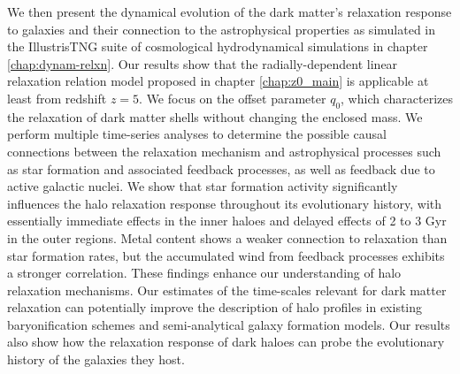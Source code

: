 \documentclass[a4paper, 12pt, oneside]{Thesis}  %
\begin{document}
{We then present the dynamical evolution of the dark matter's relaxation response to galaxies and their connection to the astrophysical properties as simulated in the IllustrisTNG suite of cosmological hydrodynamical simulations in chapter \ref{chap:dynam-relxn}. Our results show that the radially-dependent linear relaxation relation model proposed in chapter \ref{chap:z0_main} is applicable at least from redshift \(z=5\). We focus on the offset parameter \(q_0\), which characterizes the relaxation of dark matter shells without changing the enclosed mass. We perform multiple time-series analyses to determine the possible causal connections between the relaxation mechanism and astrophysical processes such as star formation and associated feedback processes, as well as feedback due to active galactic nuclei. We show that star formation activity significantly influences the halo relaxation response throughout its evolutionary history, with essentially immediate effects in the inner haloes and delayed effects of 2 to 3 Gyr in the outer regions. Metal content shows a weaker connection to relaxation than star formation rates, but the accumulated wind from feedback processes exhibits a stronger correlation. These findings enhance our understanding of halo relaxation mechanisms. Our estimates of the time-scales relevant for dark matter relaxation can potentially improve the description of halo profiles in existing baryonification schemes and semi-analytical galaxy formation models. Our results also show how the relaxation response of dark haloes can probe the evolutionary history of the galaxies they host.

}
\end{document}
